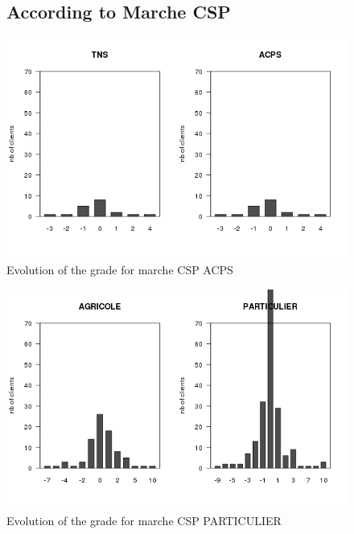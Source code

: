 \documentclass[a4paper, 11pt]{article}
\begin{document}
        \begin{figure}[!ht]
				\subsection{According to Marche CSP}
                \centering
                \includegraphics[height = 10 cm]{Remi/Evolution_of_the_grade_for_marche_CSP_ACPS.png}
                \caption{Evolution of the grade for marche CSP ACPS}
                \label{fig:e_CSP_ACPS}
        \end{figure}

        \begin{figure}[!ht]
                \centering
                \includegraphics[height = 10 cm]{Remi/Evolution_of_the_grade_for_marche_CSP_PARTICULIER.png}
                \caption{Evolution of the grade for marche CSP PARTICULIER}
                \label{fig:e_CSP_PARTICULIER}
        \end{figure}
\end{document}
